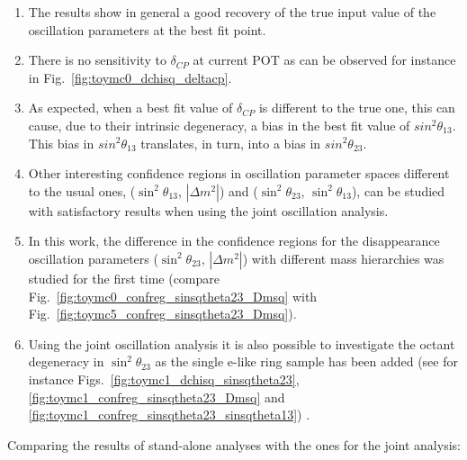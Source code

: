 \begin{enumerate}
\item{The results show in general a good recovery of the true input value of the oscillation parameters at the best fit point. } 
\item{There is no sensitivity to $\delta_{CP}$ at current POT as can be observed for instance in Fig.\ \ref{fig:toymc0_dchisq_deltacp}. }
\item{As expected, when a best fit value of $\delta_{CP}$ is different to the true one, this can cause, due to their intrinsic degeneracy, 
a bias in the best fit value of $sin^{2}\theta_{13}$.  This bias in  $sin^{2}\theta_{13}$ translates, in turn, into a bias in $sin^{2}\theta_{23}$.  }
\item{Other interesting confidence regions in oscillation parameter spaces different to the usual ones, 
    ($\sin^{2}\theta_{13}$, $|\Delta m^{2}|$) and  ($\sin^{2}\theta_{23}$, $\sin^{2}\theta_{13}$), 
    can be studied with satisfactory results when using the joint oscillation analysis. }
\item{In this work, the difference in the confidence regions for the disappearance oscillation parameters 
($\sin^{2}\theta_{23}$, $|\Delta m^{2}|$) with different mass hierarchies was studied for the first time 
(compare Fig.\ \ref{fig:toymc0_confreg_sinsqtheta23_Dmsq} with Fig.\ \ref{fig:toymc5_confreg_sinsqtheta23_Dmsq}).} 
\item{Using the joint oscillation analysis it is also possible to investigate the octant degeneracy 
    in $\sin^{2}\theta_{23}$ as the single e-like ring sample has been added (see for instance Figs.\ \ref{fig:toymc1_dchisq_sinsqtheta23}, 
    \ref{fig:toymc1_confreg_sinsqtheta23_Dmsq}  and  \ref{fig:toymc1_confreg_sinsqtheta23_sinsqtheta13}) . }
\end{enumerate}

Comparing the results of stand-alone analyses with the ones for the joint analysis:

